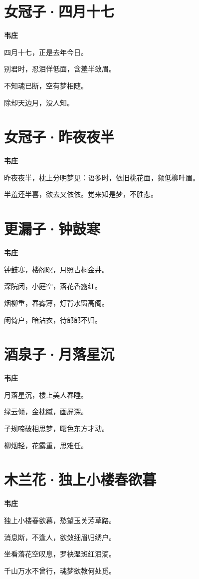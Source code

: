 \documentclass[12pt,a4paper]{ctexbook}
\begin{document}
\section{女冠子·四月十七}
\textbf{韦庄}\par\vspace{0.5em}
四月十七，正是去年今日。\par
别君时，忍泪佯低面，含羞半敛眉。\par
不知魂已断，空有梦相随。\par
除却天边月，没人知。\par

\section{女冠子·昨夜夜半}
\textbf{韦庄}\par\vspace{0.5em}
昨夜夜半，枕上分明梦见：语多时，依旧桃花面，频低柳叶眉。\par
半羞还半喜，欲去又依依。觉来知是梦，不胜悲。\par

\section{更漏子·钟鼓寒}
\textbf{韦庄}\par\vspace{0.5em}
钟鼓寒，楼阁暝，月照古桐金井。\par
深院闭，小庭空，落花香露红。\par
烟柳重，春雾薄，灯背水窗高阁。\par
闲倚户，暗沾衣，待郎郎不归。\par

\section{酒泉子·月落星沉}
\textbf{韦庄}\par\vspace{0.5em}
月落星沉，楼上美人春睡。\par
绿云倾，金枕腻，画屏深。\par
子规啼破相思梦，曙色东方才动。\par
柳烟轻，花露重，思难任。\par

\section{木兰花·独上小楼春欲暮}
\textbf{韦庄}\par\vspace{0.5em}
独上小楼春欲暮，愁望玉关芳草路。\par
消息断，不逢人，欲敛细眉归绣户。\par
坐看落花空叹息，罗袂湿斑红泪滴。\par
千山万水不曾行，魂梦欲教何处觅。\par
\end{document}
